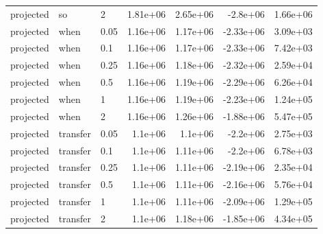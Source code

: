 \begin{center}
\begin{tabular}{lllrrrr}
projected & so & 2 & 1.81e+06 & 2.65e+06 & -2.8e+06 & 1.66e+06\\
projected & when & 0.05 & 1.16e+06 & 1.17e+06 & -2.33e+06 & 3.09e+03\\
projected & when & 0.1 & 1.16e+06 & 1.17e+06 & -2.33e+06 & 7.42e+03\\
projected & when & 0.25 & 1.16e+06 & 1.18e+06 & -2.32e+06 & 2.59e+04\\
projected & when & 0.5 & 1.16e+06 & 1.19e+06 & -2.29e+06 & 6.26e+04\\
projected & when & 1 & 1.16e+06 & 1.19e+06 & -2.23e+06 & 1.24e+05\\
projected & when & 2 & 1.16e+06 & 1.26e+06 & -1.88e+06 & 5.47e+05\\
projected & transfer & 0.05 & 1.1e+06 & 1.1e+06 & -2.2e+06 & 2.75e+03\\
projected & transfer & 0.1 & 1.1e+06 & 1.11e+06 & -2.2e+06 & 6.78e+03\\
projected & transfer & 0.25 & 1.1e+06 & 1.11e+06 & -2.19e+06 & 2.35e+04\\
projected & transfer & 0.5 & 1.1e+06 & 1.11e+06 & -2.16e+06 & 5.76e+04\\
projected & transfer & 1 & 1.1e+06 & 1.11e+06 & -2.09e+06 & 1.29e+05\\
projected & transfer & 2 & 1.1e+06 & 1.18e+06 & -1.85e+06 & 4.34e+05\\
\bottomrule\end{tabular}\end{center}

\clearpage

\clearpage

\clearpage
